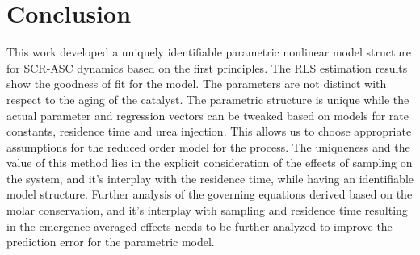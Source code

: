 \newpage
\section{Conclusion}
This work developed a uniquely identifiable parametric nonlinear model structure for SCR-ASC dynamics based on the first
principles. The RLS estimation results show the goodness of fit for the model. The parameters are not distinct with
respect to the aging of the catalyst. The parametric structure is unique while the actual parameter and regression
vectors can be tweaked based on models for rate constants, residence time and urea injection. This allows us to choose
appropriate assumptions for the reduced order model for the process. The uniqueness and the value of this method lies in
the explicit consideration of the effects of sampling on the system, and it's interplay with the residence time, while
having an identifiable model structure. Further analysis of the governing equations derived based on the molar
conservation, and it's interplay with sampling and residence time resulting in the emergence averaged effects needs to
be further analyzed to improve the prediction error for the parametric model.
